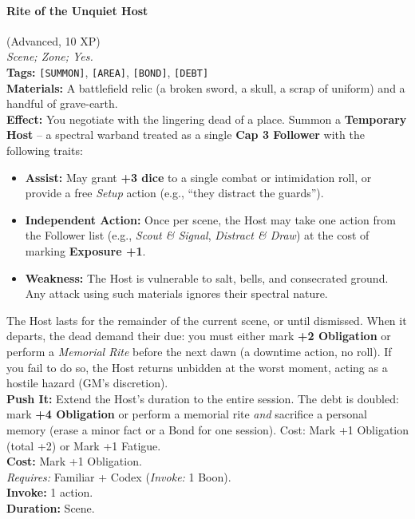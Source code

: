 \paragraph{Rite of the Unquiet Host} (Advanced, 10 XP) \hfill \\
\emph{Scene; Zone; Yes.} \\
\textbf{Tags:} \texttt{[SUMMON]}, \texttt{[AREA]}, \texttt{[BOND]}, \texttt{[DEBT]} \\
\textbf{Materials:} A battlefield relic (a broken sword, a skull, a scrap of uniform) and a handful of grave-earth. \\
\textbf{Effect:} You negotiate with the lingering dead of a place. Summon a \textbf{Temporary Host} -- a spectral warband treated as a single \textbf{Cap 3 Follower} with the following traits:
\begin{itemize}
  \item \textbf{Assist:} May grant \textbf{+3 dice} to a single combat or intimidation roll, or provide a free \textit{Setup} action (e.g., ``they distract the guards'').
  \item \textbf{Independent Action:} Once per scene, the Host may take one action from the Follower list (e.g., \textit{Scout \& Signal}, \textit{Distract \& Draw}) at the cost of marking \textbf{Exposure +1}.
  \item \textbf{Weakness:} The Host is vulnerable to salt, bells, and consecrated ground. Any attack using such materials ignores their spectral nature.
\end{itemize}
The Host lasts for the remainder of the current scene, or until dismissed. When it departs, the dead demand their due: you must either mark \textbf{+2 Obligation} or perform a \textit{Memorial Rite} before the next dawn (a downtime action, no roll). If you fail to do so, the Host returns unbidden at the worst moment, acting as a hostile hazard (GM's discretion). \\
\textbf{Push It:} Extend the Host's duration to the entire session. The debt is doubled: mark \textbf{+4 Obligation} or perform a memorial rite \textit{and} sacrifice a personal memory (erase a minor fact or a Bond for one session). Cost: Mark +1 Obligation (total +2) or Mark +1 Fatigue. \\
\textbf{Cost:} Mark +1 Obligation. \\
\textit{Requires:} Familiar + Codex (\textit{Invoke:} 1 Boon). \\
\textbf{Invoke:} 1 action. \\
\textbf{Duration:} Scene.

